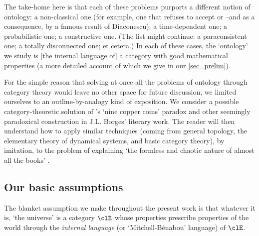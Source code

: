 The take-home here is that each of these problems purports a different notion of ontology: a non-classical one (for example, one that refuses to accept  or  --and  as a consequence, by a famous result of Diaconescu); a time-dependent one; a probabilistic one; a constructive one. (The list might continue: a paraconsistent one; a totally disconnected one; et cetera.)
In each of these cases, the `ontology' we study is [the internal language of] a category with good mathematical properties (a more detailed account of which we give in our \autoref{sec_prelim}).

For the simple reason that solving at once all the problems of ontology through category theory would leave no other space for future discussion, we limited ourselves to an outline-by-analogy kind of exposition. We consider a possible category-theoretic solution of \tlon's `nine copper coins' paradox and other seemingly paradoxical construction in J.L. Borges' literary work. The reader will then understand how to apply similar techniques (coming from general topology, the elementary theory of dynamical systems, and basic category theory), by imitation, to the problem of explaining `the formless and chaotic nature of almost all the books' \cite{tlonEN}.


\subsection{Our basic assumptions}

The blanket assumption we make throughout the present work is that whatever it is, `the universe' is a category $\clE$ whose properties prescribe properties of the world through the \emph{internal language} (or `Mitchell-Bénabou' language) of $\clE$.

